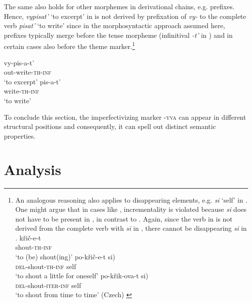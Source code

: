 \documentclass[output=paper,colorlinks,citecolor=brown]{langscibook}
\begin{document}
The same also holds for other morphemes in derivational chains, e.g. prefixes. Hence, \textit{vypisat'} ‘to excerpt’ in  is not derived by prefixation of \textit{vy-} to the complete verb \textit{pisat'} ‘to write’ since in the morphosyntactic approach assumed here, prefixes typically merge before the tense morpheme (infinitival \textit{-t'} in ) and in certain cases also before the theme marker.\footnote{An analogous reasoning also applies to disappearing elements, e.g. \textit{si} ‘self’ in . One might argue that in cases like , incrementality is violated because \textit{si} does not have to be present in , in contrast to . Again, since the verb in  is not derived from the complete verb with \textit{si} in , there cannot be disappearing \textit{si} in .
\ea\label{biskup:ex:footnote7}\ea\gll křič-e-t\\
shout-\textsc{th-inf}\\
\glt ‘to (be) shout(ing)’\label{biskup:ex:footnote7.a}
\ex\gll po-křič-e-t \minsp{*(} si)\\
\textsc{del}-shout-\textsc{th-inf} {} self\\
\glt ‘to shout a little for oneself’\label{biskup:ex:footnote7.b}
\ex\gll po-křik-ova-t \minsp{(} si)\\
\textsc{del}-shout-\textsc{iter-inf} {} self\\
\glt ‘to shout from time to time’ \hfill (Czech) \label{biskup:ex:footnote7.c}
\z\z}

\ea\label{biskup:ex:vypisat}\ea\gll vy-pis-a-t'\\
out-write-\textsc{th-inf}\\
\glt ‘to excerpt’ \label{biskup:ex:vypisat.a}
\ex\gll pis-a-t'\\
write-\textsc{th-inf}\\
\glt ‘to write’\label{biskup:ex:vypisat.b}
\z\z

\noindent To conclude this section, the imperfectivizing marker \textsc{-yva} can appear in different structural positions and consequently, it can spell out distinct semantic properties.

\section{Analysis} \label{biskup:sec:analysis}
\end{document}
